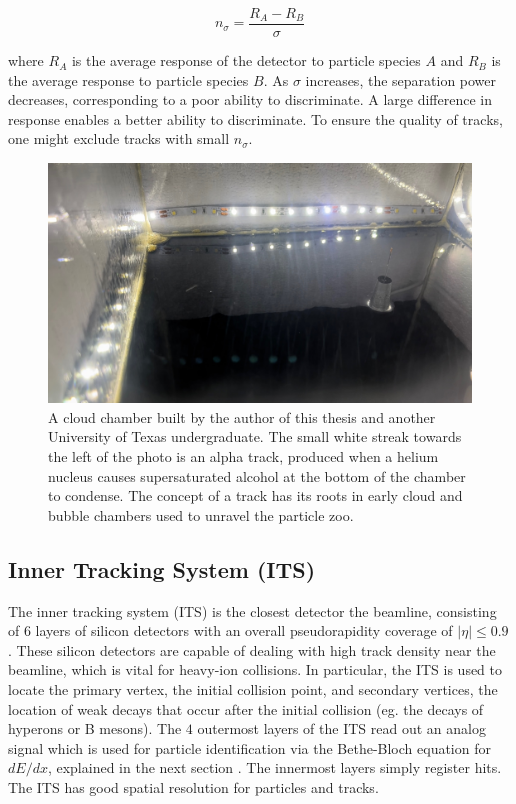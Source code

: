 \documentclass[../main.tex]{subfiles}
\begin{document}
\begin{equation}
    \label{eq:nsigma}
    n_\sigma = \frac{R_A - R_B}{\sigma}
\end{equation}

where $R_A$ is the average response of the detector to particle species $A$ and $R_B$ is the average response to particle species $B$. As $\sigma$ increases, the separation power decreases, corresponding to a poor ability to discriminate. A large difference in response enables a better ability to discriminate. To ensure the quality of tracks, one might exclude tracks with small $n_\sigma$.

\begin{figure}[h]
    \centering
    \includegraphics[scale=0.15]{introduction/figs/cloud.jpeg}
    \caption{A cloud chamber built by the author of this thesis and another University of Texas undergraduate. The small white streak towards the left of the photo is an alpha track, produced when a helium nucleus causes supersaturated alcohol at the bottom of the chamber to condense. The concept of a track has its roots in early cloud and bubble chambers used to unravel the particle zoo.}
    \label{fig:cloud}
\end{figure}


\subsection{Inner Tracking System (ITS)}
The inner tracking system (ITS) is the closest detector the beamline, consisting of $6$ layers of silicon detectors with an overall pseudorapidity coverage of $|\eta| \leq 0.9$ \cite{ALICE:tdr}. These silicon detectors are capable of dealing with high track density near the beamline, which is vital for heavy-ion collisions. In particular, the ITS is used to locate the primary vertex, the initial collision point, and secondary vertices, the location of weak decays that occur after the initial collision (eg. the decays of hyperons or B mesons). The $4$ outermost layers of the ITS read out an analog signal which is used for particle identification via the Bethe-Bloch equation for $dE/dx$, explained in the next section \cite{ALICE:tdr}. The innermost layers simply register hits. The ITS has good spatial resolution for particles and tracks. 
\end{document}
